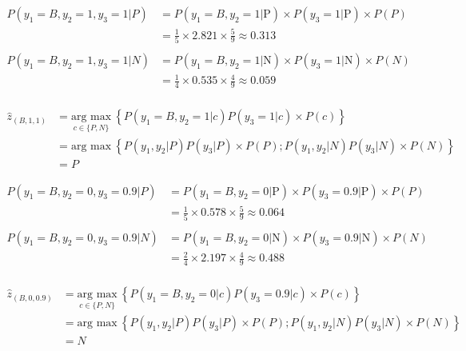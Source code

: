 \documentclass[12pt]{article}
\begin{document}
\begin{enumerate}[leftmargin=\labelsep]
    
    \begin{equation*}
        \begin{aligned}
        P(y_1 = B, y_2 = 1, y_3 = 1 | P) &= P(y_1 = B, y_2 = 1 | \text{P}) \times P(y_3 = 1 | \text{P}) \times P(P) \\
        &= \frac{1}{5} \times 2.821 \times \frac{5}{9} \approx 0.313\\
        \\
        P(y_1 = B, y_2 = 1, y_3 = 1 | N) &= P(y_1 = B, y_2 = 1 | \text{N}) \times P(y_3 = 1 | \text{N}) \times P(N) \\
        &= \frac{1}{4} \times 0.535 \times \frac{4}{9} \approx 0.059\\
        \end{aligned}
    \end{equation*}
    
    \begin{equation*}
        \begin{aligned}
            \hat{z}_{(B, 1, 1)} &= \underset{c \in \{P,N\}}{\text{arg max}} \medspace \left\{P(y_1 = B, y_2 = 1 | c) P(y_3 = 1| c) \times P(c)\right\}\\
                          & = \text{arg max} \medspace \left\{P(y_1, y_2 | P) P(y_3| P) \times P(P); P(y_1, y_2 | N) P(y_3| N) \times P(N)\right\} \\
                          & = P
        \end{aligned}
    \end{equation*}

    \begin{equation*}
        \begin{aligned}
        P(y_1 = B, y_2 = 0, y_3 = 0.9 | P) &= P(y_1 = B, y_2 = 0 | \text{P}) \times P(y_3 = 0.9 | \text{P}) \times P(P) \\
        &= \frac{1}{5} \times 0.578 \times \frac{5}{9} \approx 0.064\\
        \\
        P(y_1 = B, y_2 = 0, y_3 = 0.9 | N) &= P(y_1 = B, y_2 = 0 | \text{N}) \times P(y_3 = 0.9 | \text{N}) \times P(N) \\
        &= \frac{2}{4} \times 2.197 \times \frac{4}{9} \approx 0.488\\
        \end{aligned}
    \end{equation*}

    \begin{equation*}
        \begin{aligned}
            \hat{z}_{(B, 0, 0.9)} &= \underset{c \in \{P,N\}}{\text{arg max}} \medspace \left\{P(y_1 = B, y_2 = 0 | c) P(y_3 = 0.9| c) \times P(c)\right\}\\
                          & = \text{arg max} \medspace \left\{P(y_1, y_2 | P) P(y_3| P) \times P(P); P(y_1, y_2 | N) P(y_3| N) \times P(N)\right\} \\
                          & = N 
        \end{aligned}
    \end{equation*}


\end{enumerate}
\end{document}
